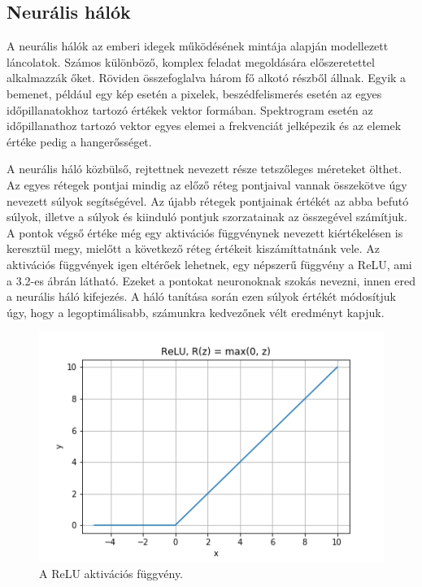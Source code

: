 \subsection{Neurális hálók}

A neurális hálók az emberi idegek működésének mintája alapján modellezett láncolatok. Számos különböző, komplex feladat megoldására előszeretettel alkalmazzák őket. Röviden összefoglalva három fő alkotó részből állnak. Egyik a bemenet, például egy kép esetén a pixelek, beszédfelismerés esetén az egyes időpillanatokhoz tartozó értékek vektor formában. Spektrogram esetén az időpillanathoz tartozó vektor egyes elemei a frekvenciát jelképezik és az elemek értéke pedig a hangerősséget.

A neurális háló közbülső, rejtettnek nevezett része tetszőleges méreteket ölthet. Az egyes rétegek pontjai mindig az előző réteg pontjaival vannak összekötve úgy nevezett súlyok segítségével. Az újabb rétegek pontjainak értékét az abba befutó súlyok, illetve a súlyok és kiinduló pontjuk szorzatainak az összegével számítjuk. A pontok végső értéke még egy aktivációs függvénynek nevezett kiértékelésen is keresztül megy, mielőtt a következő réteg értékeit kiszámíttatnánk vele. Az aktivációs függvények igen eltérőek lehetnek, egy népszerű függvény a ReLU, ami a 3.2-es ábrán látható. Ezeket a pontokat neuronoknak szokás nevezni, innen ered a neurális háló kifejezés. A háló tanítása során ezen súlyok értékét módosítjuk úgy, hogy a legoptimálisabb, számunkra kedvezőnek vélt eredményt kapjuk.

\begin{figure}[!ht]
\centering
\includegraphics[width=120mm, keepaspectratio]{figures/ReLU.png}
\caption{A ReLU aktivációs függvény.}
\end{figure}

